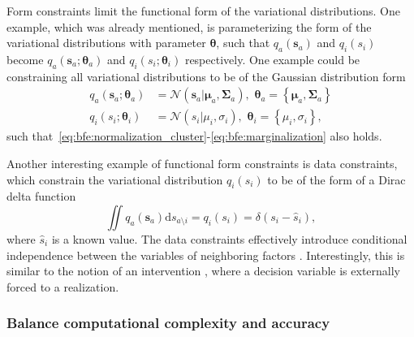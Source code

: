 Form constraints limit the functional form of the variational distributions.
One example, which was already mentioned, is parameterizing the form of the variational
distributions with parameter $\bm{\theta}$, such that $q_a(\bm{s}_a)$ and $q_i(s_i)$ become
$q_a(\bm{s}_a; \bm{\theta}_a)$ and $q_i(s_i; \bm{\theta}_i)$ respectively.
One example could be constraining all variational distributions to be of the Gaussian
distribution form \begin{equation}
    \begin{split}
      q_a(\bm{s}_a; \bm{\theta}_a) &=
      \mathcal{N}(\bm{s}_a\vert \bm{\mu}_a, \bm{\Sigma}_a),\,\,\bm{\theta}_a = \left\{ \bm{\mu}_a,
      \bm{\Sigma}_a \right\} \\ q_i(s_i; \bm{\theta}_i) &= \mathcal{N}(s_i\vert \mu_i,
      \sigma_i),\,\,\bm{\theta}_i = \left\{ \mu_i, \sigma_i \right\},
    \end{split}
  \end{equation} such that~\eqref{eq:bfe:normalization_cluster}-\eqref{eq:bfe:marginalization} also holds.

Another interesting example of functional form constraints is data constraints, which
constrain the variational distribution $q_i(s_i)$ to be of the form of a Dirac delta function
\citep{caticha_entropic_2012} \begin{equation}
    \iint q_a(\bm{s}_a)\mathrm{d}s_{a\setminus i} =
    q_i(s_i) = \delta(s_i - \hat{s}_i),
  \end{equation} where $\hat{s}_i$ is a known value. The data constraints effectively introduce conditional
  independence between the variables of neighboring factors \citep{senoz_variational_2021}. Interestingly,
  this is similar to the notion of an intervention \citep{pearl_probabilistic_1994}, where a decision variable is externally forced to a realization.

\subsubsection{Balance computational complexity and accuracy}

